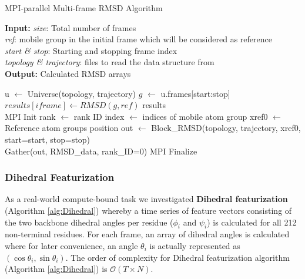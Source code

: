 \begin{algorithm}[ht!]
	\scriptsize
	\caption{MPI-parallel Multi-frame RMSD Algorithm}
	\label{alg:RMSD}
	\hspace*{\algorithmicindent} \textbf{Input:} \emph{size}: Total number of frames \\
	\hspace*{\algorithmicindent} \emph{ref}: mobile group in the initial frame which will be considered as reference \\
	\hspace*{\algorithmicindent} \emph{start \& stop}: Starting and stopping frame index\\
	\hspace*{\algorithmicindent} \emph{topology \& trajectory}: files to read the data structure from \\
	\hspace*{\algorithmicindent} \textbf{Output:} Calculated RMSD arrays
	\begin{algorithmic}[1]
		\State u $\leftarrow$ Universe(topology, trajectory)
		\State $g$ $\leftarrow$ u.frames[start:stop]
		\State $results[iframe] \leftarrow RMSD(g, ref)$
		\EndFor
		\State \Return results
		\EndProcedure
		\\        
		\State MPI Init
		\State rank $\leftarrow$ rank ID
		\State index $\leftarrow$ indices of mobile atom group
		\State xref0 $\leftarrow$ Reference atom group\textsc{}s position
		\State out $\leftarrow$ Block\_RMSD(topology, trajectory, xref0, start=start, stop=stop)
		\\
		\State Gather(out, RMSD\_data, rank\_ID=0)
		\State MPI Finalize
	\end{algorithmic}
\end{algorithm}

\subsubsection{Dihedral Featurization}
As a real-world compute-bound task we investigated \textbf{Dihedral featurization} \cite{Sittel:2014aa} (Algorithm \ref{alg:Dihedral}) whereby a time series of
feature vectors consisting of the two backbone dihedral angles per residue ($\phi_{i}$ and $\psi_{i}$) is calculated for all 212
non-terminal residues. For each frame, an array of dihedral angles is calculated where for later convenience, an angle $\theta_{i}$ is
actually represented as $(\cos\theta_{i}, \sin\theta_{i})$. 
The order of complexity for Dihedral featurization algorithm (Algorithm \ref{alg:Dihedral}) is $\mathcal{O}(T \times N)$. 


